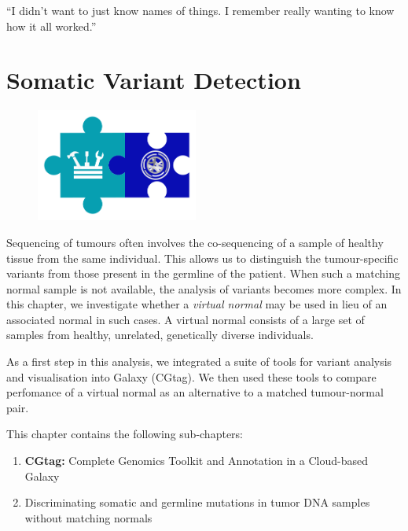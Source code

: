 \begin{savequote}[75mm]
“I didn’t want to just know names of things. I remember really wanting to know how it all worked.”
\end{savequote}

\chapter{Somatic Variant Detection}\label{chapter:virtualnormal}
\setcounter{figure}{-1}
\setcounter{table}{-1}
\setcounter{section}{-1}

\begin{figure}[t!]
\includegraphics[height=10em]{frontmatter/images/chapter-header-variants-tools.png}
\end{figure}
\setcounter{figure}{-1}
\setcounter{table}{-1}
\setcounter{section}{-1}


Sequencing of tumours often involves the co-sequencing of a sample of healthy tissue from the same individual. This allows us to distinguish the tumour-specific variants from those present in the germline of the patient. When such a matching normal sample is not available, the analysis of variants becomes more complex. In this chapter, we investigate whether a \emph{virtual normal} may be used in lieu of an associated normal in such cases. A virtual normal consists of a large set of samples from healthy, unrelated, genetically diverse individuals.

As a first step in this analysis, we integrated a suite of tools for variant analysis and visualisation into Galaxy (CGtag). We then used these tools to compare perfomance of a virtual normal as an alternative to a matched tumour-normal pair.

This chapter contains the following sub-chapters:

\begin{enumerate}[label=\ref{chapter:virtualnormal}.\arabic*]
\itemsep-0.5em
\setcounter{enumi}{-1}
\item \textbf{CGtag:} Complete Genomics Toolkit and Annotation in a Cloud-based Galaxy
\item Discriminating somatic and germline mutations in tumor DNA samples without matching normals
\end{enumerate}
